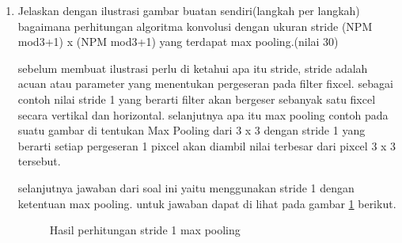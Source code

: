 \begin{enumerate}
\item Jelaskan dengan ilustrasi gambar buatan sendiri(langkah per langkah) bagaimana perhitungan algoritma konvolusi dengan ukuran stride (NPM mod3+1) x (NPM mod3+1) yang terdapat max pooling.(nilai 30)\par
 sebelum membuat ilustrasi perlu di ketahui apa itu stride, stride adalah acuan atau parameter yang menentukan pergeseran pada filter fixcel. sebagai contoh nilai stride 1 yang berarti filter akan bergeser sebanyak satu fixcel secara vertikal dan horizontal. selanjutnya apa itu max pooling contoh pada suatu gambar di tentukan Max Pooling dari 3 x 3 dengan stride 1 yang berarti setiap pergeseran 1 pixcel akan diambil nilai terbesar dari pixcel 3 x 3 tersebut.\par

selanjutnya jawaban dari soal ini yaitu menggunakan stride 1 dengan ketentuan max pooling. untuk jawaban dapat di lihat pada gambar \ref{c140} berikut. 
\begin{figure}[!htbp]
      \caption{Hasil perhitungan stride 1 max pooling}
      \label{c140}
      \end{figure}
\end{enumerate}

